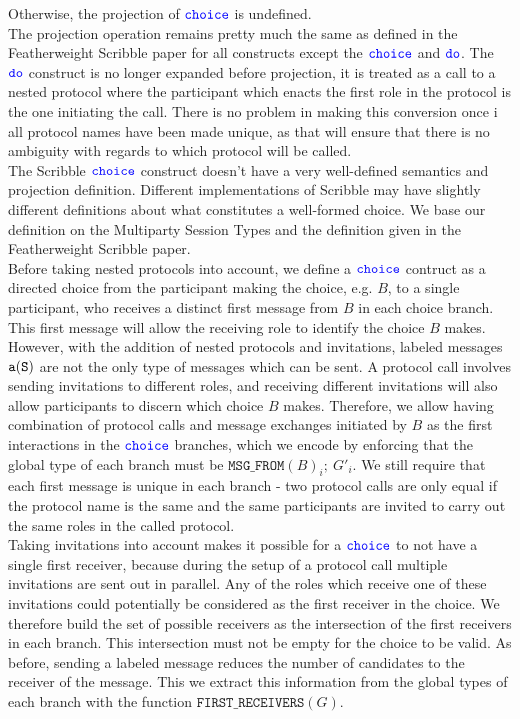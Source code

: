 \documentclass[12pt,twoside]{report}
\begin{document}
Otherwise, the projection of ${\color{blue}\mathtt{choice}}$ is undefined.\\


The projection operation remains pretty much the same as defined in the Featherweight Scribble paper\cite{featherweight} for all constructs except the ${\color{blue}\mathtt{choice}}$ and ${\color{blue}\mathtt{do}}$. The ${\color{blue}\mathtt{do}}$ construct is no longer expanded before projection, it is treated as a call to a nested protocol where the participant which enacts the first role in the protocol is the one initiating the call. There is no problem in making this conversion once i all protocol names have been made unique, as that will ensure that there is no ambiguity with regards to which protocol will be called. \\

The Scribble ${\color{blue}\mathtt{choice}}$ construct doesn't have a very well-defined semantics and projection definition. Different implementations of Scribble may have slightly different definitions about what constitutes a well-formed choice.  We base our definition on the Multiparty Session Types\cite{gentleintrotompst} and the definition given in the Featherweight Scribble paper\cite{featherweight}.\\

Before taking nested protocols into account, we define a ${\color{blue}\mathtt{choice}}$ contruct as a directed choice from the participant making the choice, e.g. $B$, to a single participant, who receives a distinct first message from $B$ in each choice branch. This first message will allow the receiving role to identify the choice $B$ makes. However, with the addition of nested protocols and invitations, labeled messages $\mathtt{a}(\mathtt{S})$ are not the only type of messages which can be sent. A protocol call involves sending invitations to different roles, and receiving different invitations will also allow participants to discern which choice $B$ makes. Therefore, we allow having combination of protocol calls and message exchanges initiated by $B$ as the first interactions in the ${\color{blue}\mathtt{choice}}$ branches, which we encode by enforcing that the global type of each branch must be $\mathtt{MSG\_FROM}(B)_i;\ G'_i$. We still require that each first message is unique in each branch - two protocol calls are only equal if the protocol name is the same and the same participants are invited to carry out the same roles in the called protocol.\\

Taking invitations into account makes it possible for a ${\color{blue}\mathtt{choice}}$ to not have a single first receiver, because during the setup of a protocol call multiple invitations are sent out in parallel. Any of the roles which receive one of these invitations could potentially be considered as the first receiver in the choice. We therefore build the set of possible receivers as the intersection of the first receivers in each branch. This intersection must not be empty for the choice to be valid. As before, sending a labeled message reduces the number of candidates to the receiver of the message. This we extract this information from the global types of each branch with the function $\mathtt{FIRST\_RECEIVERS}(G)$.\\
\end{document}
